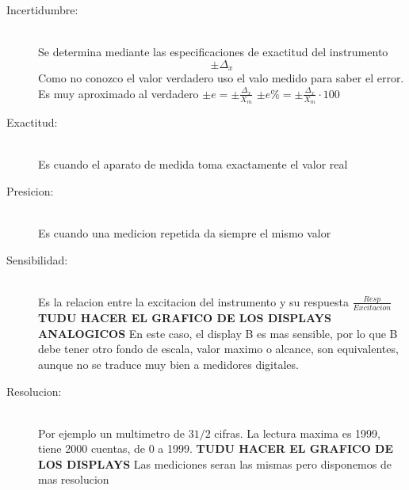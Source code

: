 \begin{description}
  \item[Incertidumbre:] \hfill \\ Se determina mediante las especificaciones de exactitud
    del instrumento $$\pm \Delta_x$$
    Como no conozco el valor verdadero uso el valo medido para saber el error. Es muy
    aproximado al verdadero $\pm e = \pm \frac{\Delta_x}{X_m}$
    $\pm e\% = \pm \frac{\Delta_x}{X_m}\cdot 100$
  \item[Exactitud:] \hfill \\ Es cuando el aparato de medida toma exactamente el valor real
  \item[Presicion:] \hfill \\ Es cuando una medicion repetida da siempre el mismo valor
  \item[Sensibilidad:] \hfill \\ Es la relacion entre la excitacion del instrumento y su
    respuesta $\frac{Resp}{Excitacion}$
    \textbf{TUDU HACER EL GRAFICO DE LOS DISPLAYS ANALOGICOS}
    En este caso, el display B es mas sensible, por lo que B debe tener otro fondo de escala,
    valor maximo o alcance, son equivalentes, aunque no se traduce muy bien a medidores digitales.
  \item[Resolucion:] \hfill \\ Por ejemplo un multimetro de $3  1/2$ cifras. La lectura
    maxima es 1999, tiene 2000 cuentas, de 0 a 1999.
    \textbf{TUDU HACER EL GRAFICO DE LOS DISPLAYS}
    Las mediciones seran las mismas pero disponemos de mas resolucion
\end{description}
